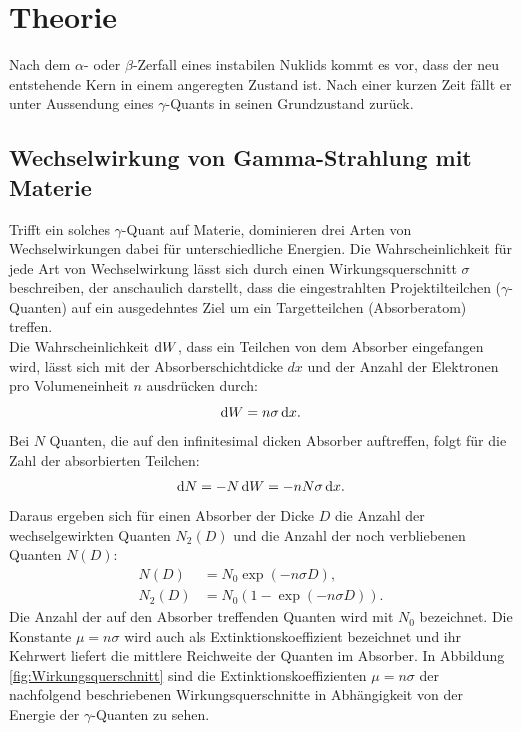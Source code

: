 \section{Theorie}
\label{sec:Theorie}

Nach dem $\alpha$- oder $\beta$-Zerfall eines instabilen Nuklids kommt es vor, dass der neu entstehende Kern in einem angeregten Zustand ist. Nach einer kurzen Zeit fällt er unter Aussendung eines $\gamma$-Quants in seinen Grundzustand zurück.

\subsection{Wechselwirkung von Gamma-Strahlung mit Materie}

Trifft ein solches $\gamma$-Quant auf Materie, dominieren drei Arten von Wechselwirkungen dabei für unterschiedliche Energien. Die Wahrscheinlichkeit für jede Art von Wechselwirkung lässt sich durch einen Wirkungsquerschnitt $\sigma$ beschreiben, der anschaulich darstellt, dass die eingestrahlten Projektilteilchen ($\gamma$-Quanten) auf ein ausgedehntes Ziel um ein Targetteilchen (Absorberatom) treffen.\\
Die Wahrscheinlichkeit $\mathop{}\!\mathrm{d} W$, dass ein Teilchen von dem Absorber eingefangen wird, lässt sich mit der Absorberschichtdicke $dx$ und der Anzahl der Elektronen pro Volumeneinheit $n$ ausdrücken durch:
\begin{equation}
\mathop{}\!\mathrm{d} W = n \sigma \mathop{}\!\mathrm{d} x\text{.}
\end{equation}
Bei $N$ Quanten, die auf den infinitesimal dicken Absorber auftreffen, folgt für die Zahl der absorbierten Teilchen:
\begin{align*}
\mathop{}\!\mathrm{d} N = -N  \mathop{}\!\mathrm{d} W =-n N \sigma \mathop{}\!\mathrm{d} x\text{.}
\end{align*}
Daraus ergeben sich für einen Absorber der Dicke $D$ die Anzahl der wechselgewirkten Quanten $N_2(D)$ und die Anzahl der noch verbliebenen Quanten $N(D)$:
\begin{align}
N(D) 	&= N_0 \exp(-n \sigma D) \text{,}\\ 
N_2(D) 	&= N_0 (1 - \exp(-n \sigma D))\text{.}\label{eq:Nd}
\end{align}
Die Anzahl der auf den Absorber treffenden Quanten wird mit $N_0$ bezeichnet. Die Konstante $ \mu = n \sigma$ wird auch als Extinktionskoeffizient bezeichnet und ihr Kehrwert liefert die mittlere Reichweite der Quanten im Absorber. In Abbildung \ref{fig:Wirkungsquerschnitt} sind die Extinktionskoeffizienten $\mu=n\sigma$ der nachfolgend beschriebenen Wirkungsquerschnitte in Abhängigkeit von der Energie der $\gamma$-Quanten zu sehen.

